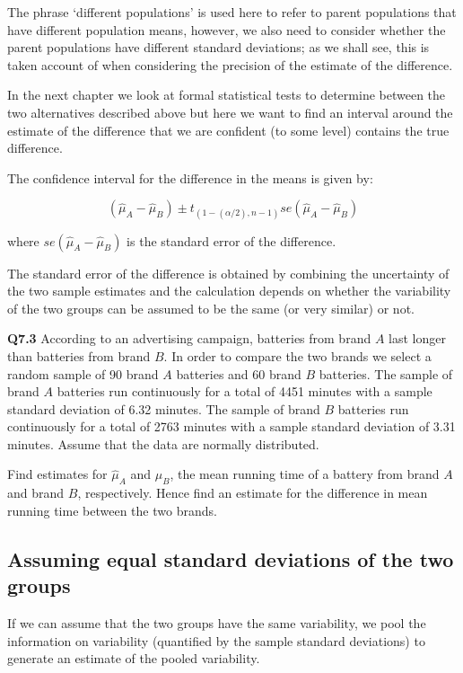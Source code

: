 \documentclass[
  oneside]{krantz}
\begin{document}
The phrase `different populations' is used here to refer to parent populations that have different population means, however, we also need to consider whether the parent populations have different standard deviations; as we shall see, this is taken account of when considering the precision of the estimate of the difference.

In the next chapter we look at formal statistical tests to determine between the two alternatives described above but here we want to find an interval around the estimate of the difference that we are confident (to some level) contains the true difference.

The confidence interval for the difference in the means is given by:

\[(\hat \mu_A - \hat \mu_B) \pm t_{(1-(\alpha/2), n-1)}se(\hat \mu_A - \hat \mu_B)\]

where \(se(\hat \mu_A - \hat \mu_B)\) is the standard error of the difference.

The standard error of the difference is obtained by combining the uncertainty of the two sample estimates and the calculation depends on whether the variability of the two groups can be assumed to be the same (or very similar) or not.

\textbf{Q7.3} According to an advertising campaign, batteries from brand \(A\) last longer than
batteries from brand \(B\). In order to compare the two brands we select a random sample of 90 brand \(A\) batteries and 60 brand \(B\) batteries. The sample of brand \(A\) batteries run continuously for a total of 4451 minutes with a sample standard deviation of 6.32 minutes. The sample of brand \(B\) batteries run continuously for a total of 2763 minutes with a sample standard deviation of 3.31 minutes. Assume that the data are normally distributed.

Find estimates for \(\hat \mu_A\) and \(\hat \mu_B\), the mean running time of a battery from brand \(A\) and brand \(B\), respectively. Hence find an estimate for the difference in mean running time between the two brands.

\hypertarget{assuming-equal-standard-deviations-of-the-two-groups}{%
\subsection{Assuming equal standard deviations of the two groups}\label{assuming-equal-standard-deviations-of-the-two-groups}}

If we can assume that the two groups have the same variability, we pool the information on variability (quantified by the sample standard deviations) to generate an estimate of the pooled variability.
\end{document}
